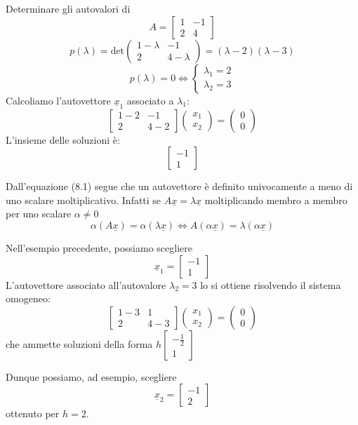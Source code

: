 \documentclass[12pt]{report}
\begin{document}
\begin{example}{}{}
Determinare gli autovalori di
\[
A = \begin{bmatrix}
	1 & -1 \\
	2 & 4
\end{bmatrix}
\]
\[
p(\lambda) = \text{det}\begin{pmatrix}
	1-\lambda & -1 \\
	2 & 4 - \lambda
\end{pmatrix} = (\lambda - 2)(\lambda - 3)
\]
\[
p(\lambda) = 0 \iff \begin{cases}
	\lambda_1 = 2 \\
	\lambda_2 = 3
\end{cases}
\]
Calcoliamo l'autovettore $\underline{x}_1$ associato a $\lambda_1$:
\[
\begin{bmatrix}
	1 - 2 & -1 \\
	2 & 4 - 2
\end{bmatrix}\begin{pmatrix}
	x_1 \\
	x_2
\end{pmatrix} = \begin{pmatrix}
	0 \\
	0
\end{pmatrix}
\]
L'insieme delle soluzioni è:
\[
\begin{bmatrix}
	-1 \\
	1
\end{bmatrix}
\]
\begin{note}{}{}
Dall'equazione (8.1) segue che un autovettore è definito univocamente a meno di uno scalare moltiplicativo. Infatti se $A\underline{x} = \lambda\underline{x}$ moltiplicando membro a membro per uno scalare $\alpha \neq 0$
\[
\alpha\left(A\underline{x}\right) = \alpha\left(\lambda\underline{x}\right) \iff A\left(\alpha\underline{x}\right) = \lambda\left(\alpha\underline{x}\right)
\]
\end{note}
Nell'esempio precedente, possiamo scegliere
\[
\underline{x}_1 = \begin{bmatrix}
	-1 \\
	1
\end{bmatrix}
\]
L'autovettore associato all'autovalore $\lambda_2 = 3$ lo si ottiene risolvendo il sistema omogeneo:
\[
\begin{bmatrix}
	1-3 & 1 \\
	2 & 4 - 3
\end{bmatrix}\begin{pmatrix}
	x_1 \\
	x_2
\end{pmatrix} = \begin{pmatrix}
	0 \\
	0
\end{pmatrix}
\]
che ammette soluzioni della forma $h\begin{bmatrix}
	-\frac{1}{2} \\
	1
\end{bmatrix}$

Dunque possiamo, ad esempio, scegliere
\[
\underline{x}_2 = \begin{bmatrix}
	-1 \\
	2
\end{bmatrix}
\]
ottenuto per $h=2$.
\end{example}
\end{document}
